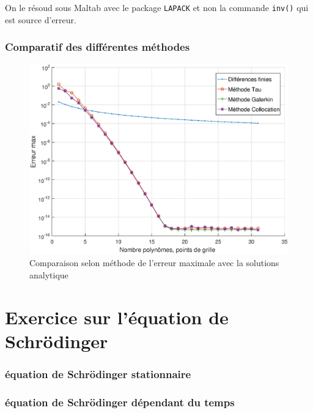 \documentclass{report}
\begin{document}
On le résoud sous Maltab avec le package \texttt{LAPACK} et non la commande \texttt{inv()} qui est source d'erreur.

\section{Comparatif des différentes méthodes}

\begin{figure}
  \includegraphics[width=13cm]{graphe_erreur.eps}
  \caption{Comparaison selon méthode de l'erreur maximale avec la solutions analytique}
  \label{fig_erreur}
\end{figure}


 \part{Exercice sur l'équation de Schrödinger}
\setcounter{section}{0}
 


\section{équation de Schrödinger stationnaire}

\section{équation de Schrödinger dépendant du temps}
\end{document}
